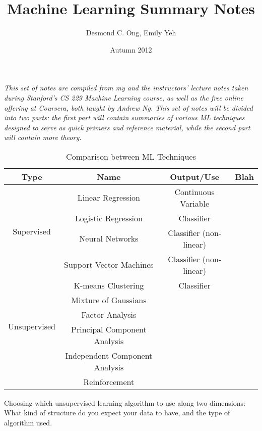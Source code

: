 \documentclass[letterpaper,10pt]{article}
\begin{document}
\author{Desmond C. Ong, Emily Yeh}
\title{Machine Learning Summary Notes}
\date{Autumn 2012}
\maketitle
\textit{This set of notes are compiled from my and the instructors' lecture notes taken during Stanford's CS 229 Machine Learning course, as well as the free online offering at Coursera, both taught by Andrew Ng. This set of notes will be divided into two parts: the first part will contain summaries of various ML techniques designed to serve as quick primers and reference material, while the second part will contain more theory.}

\tableofcontents

\newpage

\begin{table}[hbtp]
\center
\begin{tabular}{c|c|c|c}
Type & Name & Output/Use & Blah \\
\hline
\multirow{4}{*}{Supervised} & Linear Regression & Continuous Variable & \\
& Logistic Regression & Classifier & \\
& Neural Networks & Classifier (non-linear) & \\
& Support Vector Machines & Classifier (non-linear) & \\
\hline
\multirow{5}{*}{Unsupervised} & K-means Clustering & Classifier & \\
& Mixture of Gaussians  & & \\
& Factor Analysis & & \\
& Principal Component Analysis & & \\
& Independent Component Analysis  & & \\
\hline
& Reinforcement & & \\
\end{tabular}
\caption{Comparison between ML Techniques} \label{SummaryTable}
\end{table}


Choosing which unsupervised learning algorithm to use along two dimensions: What kind of structure do you expect your data to have, and the type of algorithm used.
\end{document}

